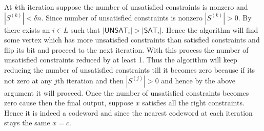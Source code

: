 At $k$th iteration  suppose the  number of unsatisfied constraints is nonzero and $|S^{(k)}|<\delta n$. Since number of  unsatisfied constraints is nonzero $|S^{(k)}|> 0$. By   there exists an $i\in L$ such that $|\mathsf{UNSAT}_i|>|\mathsf{SAT}_i|$. Hence the algorithm will find some vertex which has more unsatisfied constraints than satisfied constraints and flip its bit and proceed to the next iteration. With this process the number of unsatisfied constraints reduced by at least 1. Thus the algorithm will keep reducing the number of unsatisfied constraints till it becomes zero because if its not zero at any $j$th iteration and then $|S^{(j)}|>0$ and hence by the above argument it will proceed. Once the  number of unsatisfied constraints becomes zero cause then the final output, suppose $x$ satisfies all the right constraints. Hence it is indeed a codeword and since the nearest codeword at each iteration stays the same $x=c$. 

